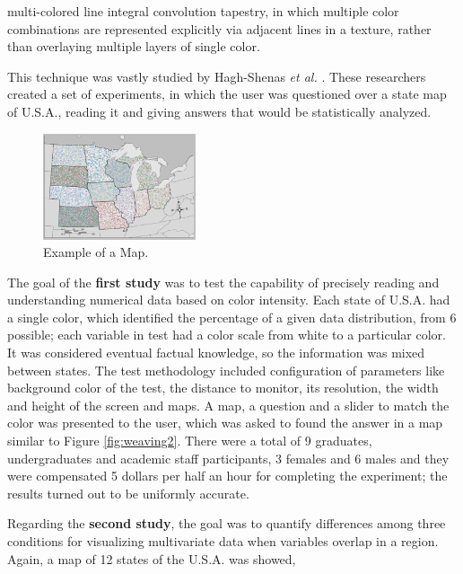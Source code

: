 multi-colored line integral convolution tapestry, in which multiple color combinations are represented
explicitly via adjacent lines in a texture, rather than overlaying multiple layers of single color. \par
This technique was vastly studied by Hagh-Shenas \emph{et al.} \cite{Hagh-Shenas2007}. These researchers created a
set of experiments, in which the user was questioned over a state map of U.S.A., reading it and giving answers
that would be statistically analyzed. \par
%
\begin{figure}
	\centering
    \vspace{-0.8\baselineskip}
    \includegraphics[width=0.4\textwidth]{images/background/WeavingTest3.png}
    \caption[Color Weaving - Second Study]{Example of a Map.
    \protect\cite{Hagh-Shenas2007}}
    \label{fig:weaving3}
\end{figure}
%
The goal of the \textbf{first study} was to test the capability of precisely reading and understanding
numerical data based on color intensity. Each state of U.S.A. had a single color, which identified the
percentage of a given data distribution, from 6 possible; each variable in test had a color scale from
white to a particular color. It was considered eventual factual knowledge, so
the information was mixed between states. The test methodology included configuration of parameters like
background color of the test, the distance to monitor, its resolution, the width and height of the screen
and maps. A map, a question and a slider to match the color was presented to the user, which was asked to
found the answer in a map similar to Figure \ref{fig:weaving2}. There were a total of 9 graduates, undergraduates and academic staff
participants, 3 females and 6 males and they were compensated 5 dollars per half an hour for completing
the experiment; the results turned out to be uniformly accurate. \par
Regarding the \textbf{second study}, the goal was to quantify differences among three conditions for visualizing
multivariate data when variables overlap in a region. Again, a map of 12 states of the U.S.A. was showed,
